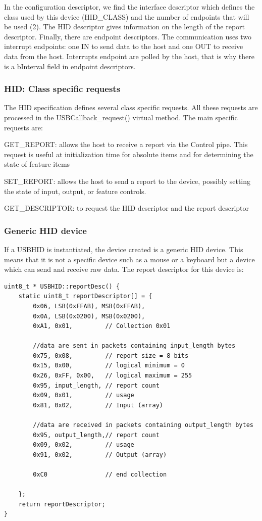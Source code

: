\documentclass[pdftex,10pt,a4paper]{report}
\newenvironment{packed_item}{
\begin{itemize}
  \setlength{\itemsep}{1pt}
  \setlength{\parskip}{0pt}
  \setlength{\parsep}{0pt}
}{\end{itemize}}
\begin{document}
In the configuration descriptor, we find the interface descriptor which defines the class used by this device (HID\_CLASS) and the number of endpoints that will be used (2). The HID descriptor gives information on the length of the report descriptor. Finally, there are endpoint descriptors. The communication uses two interrupt endpoints: one IN to send data to the host and one OUT to receive data from the host. Interrupts endpoint are polled by the host, that is why there is a bInterval field in endpoint descriptors.
\\


\subsubsection{HID: Class specific requests}
The HID specification defines several class specific requests. All these requests are processed in the USBCallback\_request() virtual method. The main specific requests are:
\begin{packed_item}
	\item GET\_REPORT: allows the host to receive a report via the Control pipe. This request is useful at initialization time for absolute items and for 
determining the state of feature items
	\item SET\_REPORT: allows the host to send a report to the device, possibly setting the state of input, output, or feature controls.
	\item GET\_DESCRIPTOR: to request the HID descriptor and the report descriptor
\end{packed_item}

\subsubsection{Generic HID device}
If a USBHID is instantiated, the device created is a generic HID device. This means that it is not a specific device such as a mouse or a keyboard but a device which can send and receive raw data. The report descriptor for this device is:
 
\begin{lstlisting}[label=Generic HID Report Descriptor,caption=Generic HID Report Descriptor]
uint8_t * USBHID::reportDesc() {
    static uint8_t reportDescriptor[] = {
        0x06, LSB(0xFFAB), MSB(0xFFAB),
        0x0A, LSB(0x0200), MSB(0x0200),
        0xA1, 0x01,         // Collection 0x01
        
        //data are sent in packets containing input_length bytes
        0x75, 0x08,         // report size = 8 bits
        0x15, 0x00,         // logical minimum = 0
        0x26, 0xFF, 0x00,   // logical maximum = 255
        0x95, input_length, // report count
        0x09, 0x01,         // usage
        0x81, 0x02,         // Input (array)
        
        //data are received in packets containing output_length bytes
        0x95, output_length,// report count
        0x09, 0x02,         // usage
        0x91, 0x02,         // Output (array)
        
        0xC0                // end collection

    };
    return reportDescriptor;
}
\end{lstlisting}
\end{document}
